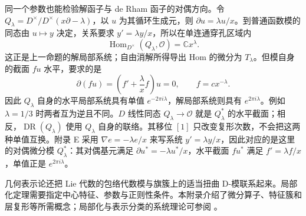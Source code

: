 同一个参数也能检验解函子与 de Rham 函子的对偶方向。令 \(Q_\lambda=D^\times/D^\times(x\partial-\lambda)\)，以 \(u\) 为其循环生成元，则 \(\partial u=\lambda u/x\)。到普通函数模的同态由 \(u\mapsto y\) 决定，关系要求 \(y'=\lambda y/x\)，所以在单连通穿孔区域内
\[
	\operatorname{Hom}_{D^\times}(Q_\lambda,\mathcal O) =\mathbb Cx^\lambda.
\]
这正是上一命题的解局部系统；自由消解所得导出 Hom 的微分为 \(T_\lambda\)。但模自身的截面 \(fu\) 水平，要求的是
\[
	\partial(fu)=\left(f'+\frac\lambda x f\right)u=0, \qquad f=cx^{-\lambda}.
\]
因此 \(Q_\lambda\) 自身的水平局部系统具有单值 \(e^{-2\pi i\lambda}\)，解局部系统则具有 \(e^{2\pi i\lambda}\)。例如 \(\lambda=1/3\) 时两者互为逆且不同。\(D\) 线性同态 \(Q_\lambda\to\mathcal O\) 就是 \(Q_\lambda^*\) 的水平截面；相反，\(\operatorname{DR}(Q_\lambda)\) 使用 \(Q_\lambda\) 自身的联络。其移位 \([1]\) 只改变复形次数，不会把这两种单值互换。附录 E 采用 \(\nabla e=-\lambda e/x\) 来写系统 \(y'=\lambda y/x\)，因此对应的是这里的对偶微分模 \(Q_\lambda^*\)：其对偶基元满足 \(\partial u^*=-\lambda u^*/x\)，水平截面 \(fu^*\) 满足 \(f'=\lambda f/x\)，单值正是 \(e^{2\pi i\lambda}\)。

\ProseParagraphBreak
几何表示论还把 Lie 代数的包络代数模与旗簇上的适当扭曲 D-模联系起来。局部化定理需要指定中心特征、参数与正则性条件。本附录介绍了微分算子、特征簇和层复形等所需概念；局部化与表示分类的系统理论可参阅 \cite[Chapter 11]{HottaTakeuchiTanisaki2008DModules}。
